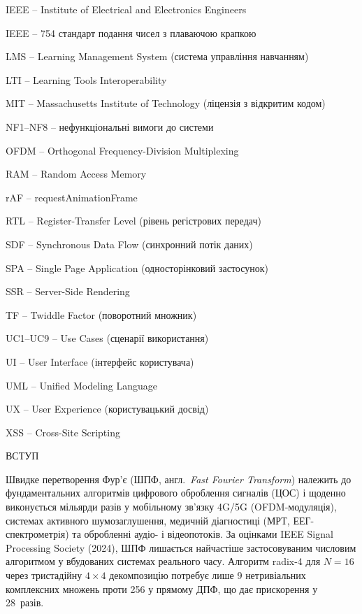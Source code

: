 IEEE -- Institute of Electrical and Electronics Engineers

IEEE -- 754 стандарт подання чисел з плаваючою крапкою

LMS -- Learning Management System (система управління навчанням)

LTI -- Learning Tools Interoperability

MIT -- Massachusetts Institute of Technology (ліцензія з відкритим
кодом)

NF1--NF8 -- нефункціональні вимоги до системи

OFDM -- Orthogonal Frequency-Division Multiplexing

RAM -- Random Access Memory

rAF -- requestAnimationFrame

RTL -- Register-Transfer Level (рівень регістрових передач)

SDF -- Synchronous Data Flow (синхронний потік даних)

SPA -- Single Page Application (односторінковий застосунок)

SSR -- Server-Side Rendering

TF -- Twiddle Factor (поворотний множник)

UC1--UC9 -- Use Cases (сценарії використання)

UI -- User Interface (інтерфейс користувача)

UML -- Unified Modeling Language

UX -- User Experience (користувацький досвід)

XSS -- Cross-Site Scripting

\textbf{\hfill\break
}

\protect{}\label{_Toc229682903}{}ВСТУП

Швидке перетворення Фур'є (ШПФ, англ.~\emph{Fast Fourier Transform})
належить до фундаментальних алгоритмів цифрового оброблення сигналів
(ЦОС) і щоденно виконується мільярди разів у мобільному зв'язку 4G/5G
(OFDM-модуляція), системах активного шумозаглушення, медичній
діагностиці (МРТ, ЕЕГ-спектрометрія) та обробленні аудіо- і
відеопотоків. За оцінками IEEE Signal Processing Society (2024), ШПФ
лишається найчастіше застосовуваним числовим алгоритмом у вбудованих
системах реального часу. Алгоритм radix-4 для \(N = 16\) через
тристадійну \(4 \times 4\) декомпозицію потребує лише 9 нетривіальних
комплексних множень проти 256 у прямому ДПФ, що дає прискорення у
28~разів.

